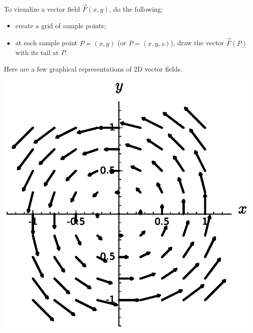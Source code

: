 To visualize a vector field $\vec{F}(x,y)$, do the following:
\begin{itemize}
    \item create a grid of sample points;
    \item at each sample point $P=(x,y)$ (or $P=(x,y,z)$), draw the vector $\vec{F}(P)$ with its tail at $P$.
\end{itemize}

\begin{example}
    Here are a few graphical representations of 2D vector fields.
    \\
    \begin{minipage}{.4\textwidth}
        \begin{center}
            \includegraphics[width=.9\textwidth]{images/vf1.eps}\label{img:sage-vector-field-1} \medskip 
            

\end{center}
\end{minipage}
\end{example}

